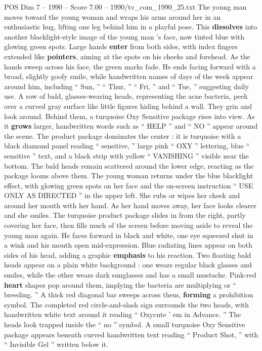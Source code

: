 \begin{textsample}{POS Dim 7 – 1990 – Score 7.00 – 1990/tv\_com\_1990\_25.txt}
The young man moves toward the young woman and wraps his arms around her in an enthusiastic hug, lifting one leg behind him in a playful pose.
This \textbf{dissolves} into another blacklight-style image of the young man ’s face, now tinted blue with glowing green spots.
Large hands \textbf{enter} from both sides, with index fingers extended like \textbf{pointers}, aiming at the spots on his cheeks and forehead.
As the hands sweep across his face, the green marks fade.
He ends facing forward with a broad, slightly goofy smile, while handwritten names of days of the week appear around him, including “ Sun, ” “ Thur, ” “ Fri, ” and “ Tue, ” suggesting daily use.
A row of bald, glasses-wearing heads, representing the acne bacteria, peek over a curved gray surface like little figures hiding behind a wall.
They grin and look around.
Behind them, a turquoise Oxy Sensitive package rises into view.
As it \textbf{grows} larger, handwritten words such as “ HELP ” and “ NO ” appear around the scene.
The product package dominates the center : it is turquoise with a black diamond panel reading “ sensitive, ” large pink “ OXY ” lettering, blue “ sensitive ” text, and a black strip with yellow “ VANISHING ” visible near the bottom.
The bald heads remain scattered around the lower edge, reacting as the package looms above them.
The young woman returns under the blue blacklight effect, with glowing green spots on her face and the on-screen instruction “ USE ONLY AS DIRECTED ” in the upper left.
She rubs or wipes her cheek and around her mouth with her hand.
As her hand moves away, her face looks clearer and she smiles.
The turquoise product package slides in from the right, partly covering her face, then fills much of the screen before moving aside to reveal the young man again.
He faces forward in black and white, one eye squeezed shut in a wink and his mouth open mid-expression.
Blue radiating lines appear on both sides of his head, adding a graphic \textbf{emphasis} to his reaction.
Two floating bald heads appear on a plain white background : one wears regular black glasses and smiles, while the other wears dark sunglasses and has a small mustache.
Pink-red \textbf{heart} shapes pop around them, implying the bacteria are multiplying or “ breeding. ” A thick red diagonal bar sweeps across them, \textbf{forming} a prohibition symbol.
The completed red circle-and-slash sign surrounds the two heads, with handwritten white text around it reading “ Oxycute ’ em in Advance. ” The heads look trapped inside the “ no ” symbol.
A small turquoise Oxy Sensitive package appears beneath curved handwritten text reading “ Product Shot, ” with “ Invisible Gel ” written below it.

\end{textsample}
